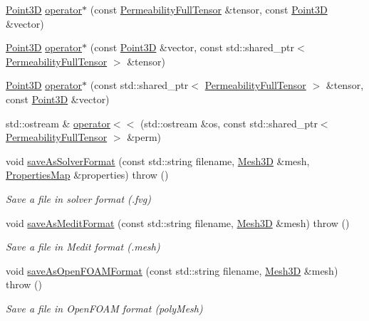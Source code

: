 \begin{DoxyCompactItemize}
\item 
\hyperlink{classFVCode3D_1_1Point3D}{Point3D} \hyperlink{namespaceFVCode3D_a81f9e4df393532a4db4ca57703ff5e21}{operator$\ast$} (const \hyperlink{classFVCode3D_1_1PermeabilityFullTensor}{Permeability\+Full\+Tensor} \&tensor, const \hyperlink{classFVCode3D_1_1Point3D}{Point3D} \&vector)
\item 
\hyperlink{classFVCode3D_1_1Point3D}{Point3D} \hyperlink{namespaceFVCode3D_a573813c3c7cd4e9ffc94ae79a84d63f7}{operator$\ast$} (const \hyperlink{classFVCode3D_1_1Point3D}{Point3D} \&vector, const std\+::shared\+\_\+ptr$<$ \hyperlink{classFVCode3D_1_1PermeabilityFullTensor}{Permeability\+Full\+Tensor} $>$ \&tensor)
\item 
\hyperlink{classFVCode3D_1_1Point3D}{Point3D} \hyperlink{namespaceFVCode3D_a2c61d86d4a5f699b41833ccfa98b4412}{operator$\ast$} (const std\+::shared\+\_\+ptr$<$ \hyperlink{classFVCode3D_1_1PermeabilityFullTensor}{Permeability\+Full\+Tensor} $>$ \&tensor, const \hyperlink{classFVCode3D_1_1Point3D}{Point3D} \&vector)
\item 
std\+::ostream \& \hyperlink{namespaceFVCode3D_a453d7ae598d14867fe6f43774e38f8e0}{operator$<$$<$} (std\+::ostream \&os, const std\+::shared\+\_\+ptr$<$ \hyperlink{classFVCode3D_1_1PermeabilityFullTensor}{Permeability\+Full\+Tensor} $>$ \&perm)
\item 
void \hyperlink{namespaceFVCode3D_ab3d72976b29466b3b389c290d0e8dadb}{save\+As\+Solver\+Format} (const std\+::string filename, \hyperlink{classFVCode3D_1_1Mesh3D}{Mesh3D} \&mesh, \hyperlink{classFVCode3D_1_1PropertiesMap}{Properties\+Map} \&properties)  throw ()
\begin{DoxyCompactList}\small\item\em Save a file in solver format (.fvg) \end{DoxyCompactList}\item 
void \hyperlink{namespaceFVCode3D_a309feff3c4ef28a971e23350d895579c}{save\+As\+Medit\+Format} (const std\+::string filename, \hyperlink{classFVCode3D_1_1Mesh3D}{Mesh3D} \&mesh)  throw ()
\begin{DoxyCompactList}\small\item\em Save a file in Medit format (.mesh) \end{DoxyCompactList}\item 
void \hyperlink{namespaceFVCode3D_a2f158b0ae2187840985b44465f65e126}{save\+As\+Open\+F\+O\+A\+M\+Format} (const std\+::string filename, \hyperlink{classFVCode3D_1_1Mesh3D}{Mesh3D} \&mesh)  throw ()
\begin{DoxyCompactList}\small\item\em Save a file in Open\+F\+O\+AM format (poly\+Mesh) \end{DoxyCompactList}\item 

\end{DoxyCompactItemize}
